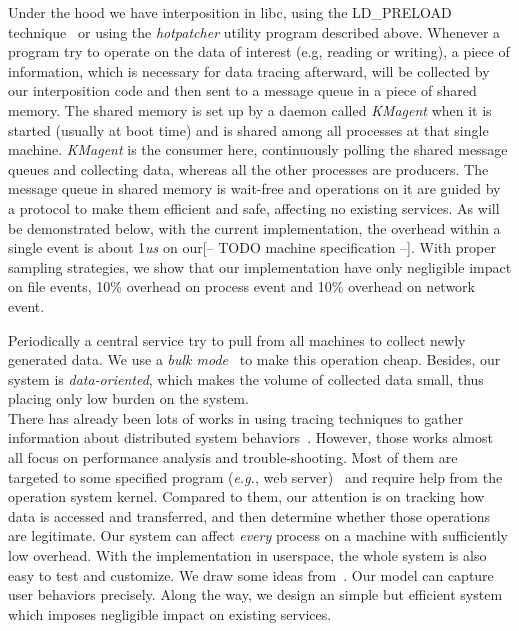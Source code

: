 \documentclass[letterpaper,twocolumn,10pt]{article}
\begin{document}
Under the hood we have interposition in libc, using the LD\_PRELOAD
technique~\cite{LDPRELOADKrentel:2013, LDPRELOADLee:2011, LDPRELOADSaito:2005}
or using the \textit{hotpatcher} utility program
described above. Whenever a program try to operate on the data of interest
(e.g, reading or writing), a piece of information, which is necessary for
data tracing afterward, will be collected by our interposition code and then
sent to a message queue in a piece of shared memory. The shared memory is set
up by a daemon called \textit{KMagent} when it is started (usually at boot
time) and is shared among all processes at that single machine.
\textit{KMagent} is the consumer here, continuously polling the shared
message queues and collecting data, whereas all the other processes are
producers. The message queue in shared memory is wait-free and operations on
it are guided by a protocol to make them efficient and safe, affecting no
existing services. As will be demonstrated below, with the current
implementation, the overhead within a single event is about 1\textit{us} on 
our[-- TODO machine specification --]. With proper sampling strategies, we
show that our implementation have only negligible impact on file events, 10\%
overhead on process event and 10\% overhead on network event. 

Periodically a central service try to pull from all machines to collect newly
generated data. We use a \textit{bulk mode}~\cite{CACMDean:2013} to make this
operation cheap. Besides, our system is \textit{data-oriented}, which makes
the volume of collected data small, thus placing only low burden on the
system.\\

There has already been lots of works in using tracing techniques to gather
information about distributed system behaviors~\cite{magpie:2004, magpie:2003,
pinpoint:2002, xtrace:2007, dapper:2010}.  However, those works almost all
focus on performance analysis and trouble-shooting. Most of them are targeted
to some specified program (\textit{e.g.}, web server)~\cite{magpie:2004,
magpie:2003} and require help from the operation system kernel. Compared to
them, our attention is on tracking how data is accessed and transferred, and
then determine whether those operations are legitimate. Our system can affect
\textit{every} process on a machine with sufficiently low overhead. With the
implementation in userspace, the whole system is also easy to test and
customize. We draw some ideas from~\cite{BackTraceKing:2003,
BackTraceKing:2005}. Our model can capture user behaviors precisely. Along the
way, we design an simple but efficient system which imposes negligible impact
on existing services.\\
\end{document}
